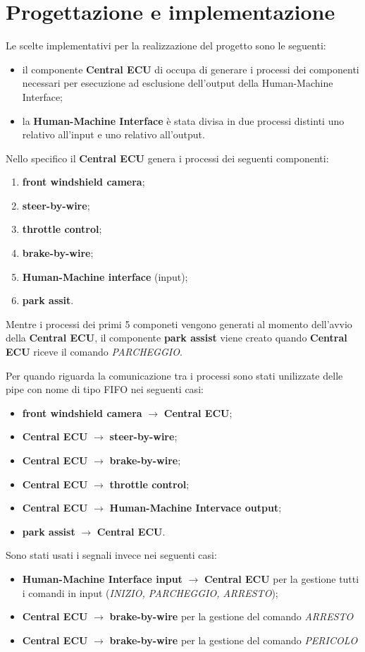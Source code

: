 \documentclass[12pt]{article}
\begin{document}
\section{Progettazione e implementazione}
Le scelte implementativi per la realizzazione del progetto sono le seguenti:
\begin{itemize}
    \item il componente {\bf Central ECU} di occupa di generare i processi dei 
    componenti necessari per esecuzione ad esclusione dell'output della Human-Machine 
    Interface;
    \item la {\bf Human-Machine Interface} \`{e} stata divisa in due processi 
    distinti uno relativo all'input e uno relativo all'output. 
\end{itemize}
Nello specifico il {\bf Central ECU} genera i processi dei seguenti componenti:
\begin{enumerate}
    \item {\bf front windshield camera};
    \item {\bf steer-by-wire};
    \item {\bf throttle control};
    \item {\bf brake-by-wire};
    \item {\bf Human-Machine interface} (input);
    \item {\bf park assit}.
\end{enumerate}
Mentre i processi dei primi 5 componeti vengono generati al momento dell'avvio 
della {\bf Central ECU}, il componente {\bf park assist} viene creato quando 
{\bf Central ECU} riceve il comando {\it PARCHEGGIO}. 

Per quando riguarda la comunicazione tra i processi sono stati unilizzate delle 
pipe con nome di tipo FIFO nei seguenti casi:
\begin{itemize}
    \item {\bf front windshield camera} $\to$ {\bf Central ECU};
    \item {\bf Central ECU} $\to$ {\bf steer-by-wire};
    \item {\bf Central ECU} $\to$ {\bf brake-by-wire};
    \item {\bf Central ECU} $\to$ {\bf throttle control};
    \item {\bf Central ECU} $\to$ {\bf Human-Machine Intervace output};
    \item {\bf park assist} $\to$ {\bf Central ECU}.
\end{itemize} 

Sono stati usati i segnali invece nei seguenti casi:
\begin{itemize}
    \item {\bf Human-Machine Interface input} $\to$ {\bf Central ECU} per la 
    gestione tutti i comandi in input ({\it INIZIO, PARCHEGGIO, ARRESTO});
    \item {\bf Central ECU} $\to$ {\bf brake-by-wire} per la gestione del comando 
    {\it ARRESTO}
    \item  {\bf Central ECU} $\to$ {\bf brake-by-wire} per la gestione del comando 
    {\it PERICOLO}
\end{itemize}
\end{document}
